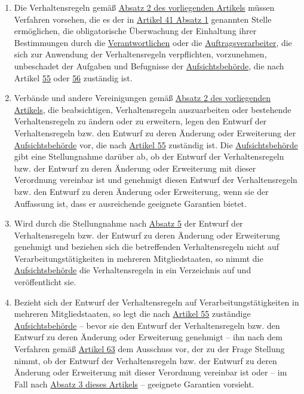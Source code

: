 \begin{enumerate}
  \item Die Verhaltensregeln gemäß \hyperref[itm:40-2]{Absatz 2 des vorliegenden Artikels} müssen Verfahren vorsehen,
   die es der in \hyperref[itm:41-2]{Artikel 41 Absatz 1} genannten Stelle ermöglichen, die obligatorische Überwachung
   der Einhaltung ihrer Bestimmungen durch die \hyperref[itm:04-7]{Verantwortlichen} oder die \hyperref[itm:04-8]
   {Auftragsverarbeiter}, die sich zur Anwendung der Verhaltensregeln verpflichten, vorzunehmen, unbeschadet der
   Aufgaben und Befugnisse der \hyperref[itm:04-21]{Aufsichtsbehörde}, die nach Artikel \hyperref[ch:55]
   {55} oder \hyperref[ch:56]{56} zuständig ist.
  \label{itm:40-4}

  \item Verbände und andere Vereinigungen gemäß \hyperref[itm:40-2]{Absatz 2 des vorliegenden Artikels}, die
   beabsichtigen, Verhaltensregeln auszuarbeiten oder bestehende Verhaltensregeln zu ändern oder zu erweitern, legen
   den Entwurf der Verhaltensregeln bzw. den Entwurf zu deren Änderung oder Erweiterung der \hyperref[itm:04-21]
   {Aufsichtsbehörde} vor, die nach \hyperref[ch:55]{Artikel 55} zuständig ist. Die \hyperref[itm:04-21]
   {Aufsichtsbehörde} gibt eine Stellungnahme darüber ab, ob der Entwurf der Verhaltensregeln bzw. der Entwurf zu deren
   Änderung oder Erweiterung mit dieser Verordnung vereinbar ist und genehmigt diesen Entwurf der Verhaltensregeln bzw.
   den Entwurf zu deren Änderung oder Erweiterung, wenn sie der Auffassung ist, dass er ausreichende geeignete
   Garantien bietet.
  \label{itm:40-5}

  \item Wird durch die Stellungnahme nach \hyperref[itm:40-5]{Absatz 5} der Entwurf der Verhaltensregeln bzw. der
   Entwurf zu deren Änderung oder Erweiterung genehmigt und beziehen sich die betreffenden Verhaltensregeln nicht auf
   Verarbeitungstätigkeiten in mehreren Mitgliedstaaten, so nimmt die \hyperref[itm:04-21]{Aufsichtsbehörde} die
   Verhaltensregeln in ein Verzeichnis auf und veröffentlicht sie.
  \label{itm:40-6}

  \item Bezieht sich der Entwurf der Verhaltensregeln auf Verarbeitungstätigkeiten in mehreren Mitgliedstaaten, so legt
   die nach \hyperref[ch:55]{Artikel 55} zuständige \hyperref[itm:04-21]{Aufsichtsbehörde} -- bevor sie den Entwurf der
   Verhaltensregeln bzw. den Entwurf zu deren Änderung oder Erweiterung genehmigt -- ihn nach dem Verfahren
   gemäß \hyperref[ch:63]{Artikel 63} dem Ausschuss vor, der zu der Frage Stellung nimmt, ob der Entwurf der
   Verhaltensregeln bzw. der Entwurf zu deren Änderung oder Erweiterung mit dieser Verordnung vereinbar ist oder -- im
   Fall nach \hyperref[itm:40-3]{Absatz 3 dieses Artikels} -- geeignete Garantien vorsieht.
  \label{itm:40-7}


\end{enumerate}
